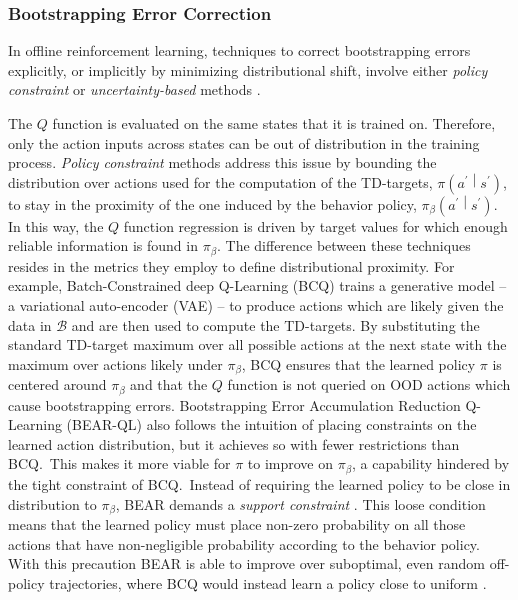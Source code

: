 \subsubsection{Bootstrapping Error
Correction}\label{sec:intro_related_work}
In offline reinforcement learning, techniques to correct bootstrapping
errors explicitly, or implicitly by minimizing distributional shift,
involve either \textit{policy constraint} or
\textit{uncertainty-based} methods \citep{levine2020offline}.

The $Q$ function is evaluated on the same states that it is
trained on. Therefore, only the action inputs across states can be out
of distribution in the training process. \textit{Policy constraint}
methods address this issue by bounding the distribution over actions
used for the computation of the TD-targets,
$\pi\left(a^\prime\middle|s^\prime\right)$, to stay in the proximity
of the one induced by the behavior policy,
$\pi_\beta\left(a^\prime\middle|s^\prime\right)$. In this way, the $Q$
function regression is driven by target values for which enough
reliable information is found in $\pi_\beta$.
The difference
between these techniques resides in the metrics they employ to define
distributional proximity.
For example, Batch-Constrained deep Q-Learning (BCQ)
\citep{pmlr-v97-fujimoto19a} trains a generative model -- a variational
auto-encoder (VAE) \citep{kingma2013auto} -- to produce actions which
are likely given the data in $\mathcal{B}$ and are then used to
compute the TD-targets.
By substituting the standard TD-target maximum over all possible
actions at the next state with the maximum over actions likely
under $\pi_\beta$, BCQ ensures that the learned policy $\pi$ is
centered around $\pi_\beta$ and that the $Q$ function is not
queried on OOD actions which cause bootstrapping errors. Bootstrapping
Error Accumulation Reduction Q-Learning (BEAR-QL)
\citep{kumar2019stabilizing} also follows the intuition of placing
constraints on the learned action distribution, but it achieves so
with fewer restrictions than BCQ.\ This makes it more viable for $\pi$
to improve on $\pi_\beta$, a capability hindered by the tight
constraint of BCQ.\ Instead of requiring the learned policy to be
close in distribution to $\pi_\beta$, BEAR demands a \textit{support
constraint} \citep{kumar}. This loose condition means that the
learned policy must place non-zero probability on all those actions
that have non-negligible probability according to the behavior policy.
With this precaution BEAR is able to improve over suboptimal, even
random off-policy trajectories, where BCQ would instead learn a policy
close to uniform \citep{kumar2019stabilizing}.

